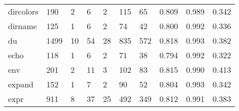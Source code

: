 \begin{longtable}{lp{1.3cm}p{1.3cm}p{1.3cm}p{1.3cm}p{1.3cm}p{1.3cm}p{1.3cm}p{1.3cm}p{1.3cm}}
dircolors &                    190 &                                  2 &                                 6 &                                2 &                               115 &                              65 &                                   0.809 &                                  0.989 &                                0.342 \\
dirname   &                    125 &                                  1 &                                 6 &                                2 &                                74 &                              42 &                                   0.800 &                                  0.992 &                                0.336 \\
du        &                   1499 &                                 10 &                                54 &                               28 &                               835 &                             572 &                                   0.818 &                                  0.993 &                                0.382 \\
echo      &                    118 &                                  1 &                                 6 &                                2 &                                71 &                              38 &                                   0.794 &                                  0.992 &                                0.322 \\
env       &                    201 &                                  2 &                                11 &                                3 &                               102 &                              83 &                                   0.815 &                                  0.990 &                                0.413 \\
expand    &                    152 &                                  1 &                                 7 &                                2 &                                90 &                              52 &                                   0.804 &                                  0.993 &                                0.342 \\
expr      &                    911 &                                  8 &                                37 &                               25 &                               492 &                             349 &                                   0.812 &                                  0.991 &                                0.383 \\

\end{longtable}
